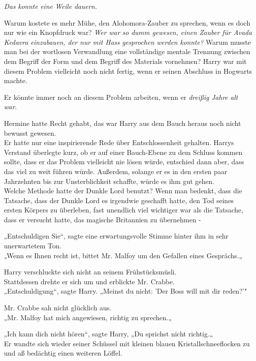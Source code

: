 {\emph{Das konnte eine Weile dauern.}

Warum kostete es mehr Mühe, den Alohomora-Zauber zu sprechen, wenn es doch nur wie ein Knopfdruck war? \emph{Wer war so dumm gewesen, einen Zauber für Avada Kedavra einzubauen, der nur mit Hass gesprochen werden konnte?} Warum musste man bei der wortlosen Verwandlung eine vollständige mentale Trennung zwischen dem Begriff der Form und dem Begriff des Materials vornehmen? Harry war mit diesem Problem vielleicht noch nicht fertig, wenn er seinen Abschluss in Hogwarts machte.

Er könnte immer noch an diesem Problem arbeiten, wenn er \emph{dreißig Jahre alt war}.

Hermine hatte Recht gehabt, das war Harry aus dem Bauch heraus noch nicht bewusst gewesen.\\ Er hatte nur eine inspirierende Rede über Entschlossenheit gehalten. Harrys Verstand überlegte kurz, ob er auf einer Bauch-Ebene zu dem Schluss kommen sollte, dass er das Problem vielleicht nie lösen würde, entschied dann aber, dass das viel zu weit führen würde. Außerdem, solange er es in den ersten paar Jahrzehnten bis zur Unsterblichkeit schaffte, würde es ihm gut gehen.\\ Welche Methode hatte der Dunkle Lord benutzt? Wenn man bedenkt, dass die Tatsache, dass der Dunkle Lord es irgendwie geschafft hatte, den Tod seines ersten Körpers zu überleben, fast unendlich viel wichtiger war als die Tatsache, dass er versucht hatte, das magische Britannien zu übernehmen -

„Entschuldigen Sie“, sagte eine erwartungsvolle Stimme hinter ihm in sehr unerwartetem Ton.\\ „Wenn es Ihnen recht ist, bittet Mr. Malfoy um den Gefallen eines Gesprächs.„

Harry verschluckte sich nicht an seinem Frühstücksmüsli.\\ Stattdessen drehte er sich um und erblickte Mr. Crabbe.\\ „Entschuldigung“, sagte Harry. „Meinst du nicht: 'Der Boss will mit dir reden?'"

Mr. Crabbe sah nicht glücklich aus.\\ „Mr. Malfoy hat mich angewiesen, richtig zu sprechen.„

„Ich kann dich nicht hören“, sagte Harry, „Du sprichst nicht richtig.„\\ Er wandte sich wieder seiner Schüssel mit kleinen blauen Kristallschneeflocken zu und aß bedächtig einen weiteren Löffel.

}

